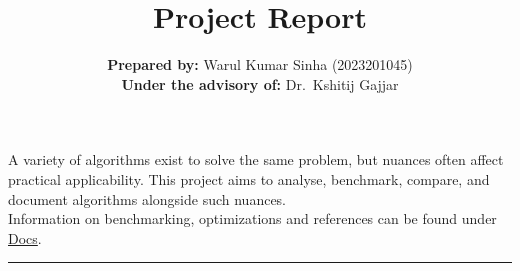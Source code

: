 \documentclass[12pt]{article}
\title{Project Report}
\author{%
  \textbf{Prepared by:} Warul Kumar Sinha (2023201045)\\
  \textbf{Under the advisory of:} Dr.\ Kshitij Gajjar
}
\date{}
\begin{document}
\maketitle
\thispagestyle{empty}

\noindent A variety of algorithms exist to solve the same problem, but nuances often affect practical applicability. This project aims to analyse, benchmark, compare, and document algorithms alongside such nuances. \\
\noindent Information on benchmarking, optimizations and references can be found under \hyperref[sec:docs]{Docs}.

\bigskip
\hrule height 1pt
\bigskip

\tableofcontents
\clearpage




\end{document}

